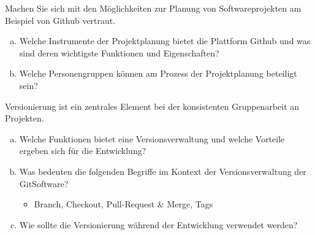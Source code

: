     
    
        \begin{aufgabe}
            Machen Sie sich mit den Möglichkeiten zur Planung von Softwareprojekten am Beispiel von Github vertraut.
            \\[-.7cm]\begin{enumerate}[(a)]
                \setlength\itemsep{0.1px}
                \item  Welche Instrumente der Projektplanung bietet die Plattform Github und was sind
                deren wichtigste Funktionen und Eigenschaften?
                \item Welche Personengruppen können am Prozess der Projektplanung beteiligt sein?

            \end{enumerate}
        \end{aufgabe}
    
        \begin{loesung}\:
            
        \end{loesung}
	
    
    
        \begin{aufgabe}
            Versionierung ist ein zentrales Element bei der konsistenten Gruppenarbeit an Projekten.
            \\[-.7cm]\begin{enumerate}[(a)]
                \setlength\itemsep{0.1px}
                \item Welche Funktionen bietet eine Versionsverwaltung und welche Vorteile ergeben sich für die Entwicklung?
                \item Was bedeuten die folgenden Begriffe im Kontext der Versionsverwaltung der GitSoftware?
                \\[-.7cm]\begin{itemize}
                    \setlength\itemsep{0.1px}
                    \item Branch, Checkout, Pull-Request \& Merge, Tags
                \end{itemize}
                \item Wie sollte die Versionierung während der Entwicklung verwendet werden?
            \end{enumerate}
        \end{aufgabe}
    
        \begin{loesung}\:
            
        \end{loesung}
	

